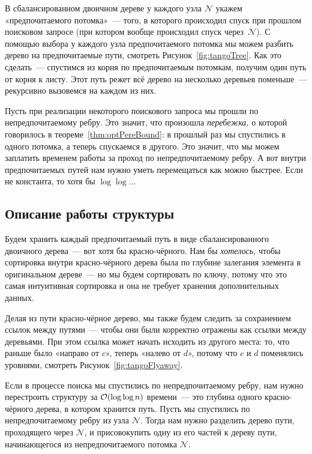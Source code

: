 В сбалансированном двоичном дереве у каждого узла $\mathcal N$ укажем «предпочитаемого потомка»~— того, в которого происходил спуск при прошлом поисковом запросе (при котором вообще происходил спуск через~$\mathcal N$). С помощью выбора у каждого узла предпочитаемого потомка мы можем разбить дерево на предпочитаемые пути, смотреть Рисунок~\ref{fig:tangoTree}. Как это сделать~--- спустимся из корня по предпочитаемым потомкам, получим один путь от корня к листу. Этот путь режет всё дерево на несколько деревьев поменьше~— рекурсивно вызовемся на каждом из них. 

Пусть при реализации некоторого поискового запроса мы прошли по непредпочитаемому ребру. Это значит, что произошла {\it перебежка,} о которой говорилось в теореме~\ref{thm:optPereBound}: в прошлый раз мы спустились в одного потомка, а теперь спускаемся в другого. Это значит, что мы можем заплатить временем работы за проход по непредпочитаемому ребру. А вот внутри предпочитаемых путей нам нужно уметь перемещаться как можно быстрее. Если не константа, то хотя бы $\log \log$...

\subsection{Описание работы структуры}

Будем хранить каждый предпочитаемый путь в виде сбалансированного двоичного дерева~— вот хотя бы красно-чёрного. Нам бы {\it хотелось,} чтобы сортировка внутри красно-чёрного дерева была по глубине залегания элемента в оригинальном дереве~— но мы будем сортировать по ключу, потому что это самая интуитивная сортировка и она не требует хранения дополнительных данных.

Делая из пути красно-чёрное дерево, мы также будем следить за сохранением ссылок между путями~--- чтобы они были корректно отражены как ссылки между деревьями. При этом ссылка может начать исходить из другого места: то, что раньше было «направо от $c$», теперь «налево от $d$», потому что $c$ и $d$ поменялись уровнями, смотреть Рисунок~\ref{fig:tangoFlyaway}. 

Если в процессе поиска мы спустились по непредпочитаемому ребру, нам нужно перестроить структуру за $\mathcal{O} (\log \log n)$ времени~--- это глубина одного красно-чёрного дерева, в котором хранится путь. Пусть мы спустились по непредпочитаемому ребру из узла $\mathcal N$. Тогда нам нужно разделить дерево пути, проходящего через $\mathcal N$, и присовокупить одну из его частей к дереву пути, начинающегося из непредпочитаемого потомка $\mathcal N$.

